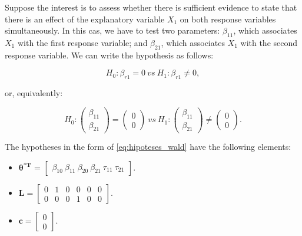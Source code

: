 \documentclass[article]{jss}\usepackage[]{graphicx}\usepackage[]{xcolor}
\begin{document}
Suppose the interest is to assess whether there is sufficient evidence to state that there is an effect of the explanatory variable $X_1$ on both response variables simultaneously. 
In this cas, we  have to test two parameters: $\beta_{11}$, which associates $X_1$ with the first response variable; and $\beta_{21}$, which associates $X_1$ with the second response variable. 
We can write the hypothesis as follows:

\begin{equation}
\label{eq:ex2}
H_0: \beta_{r1} = 0 \ vs \ H_1: \beta_{r1} \neq 0,
\end{equation}

\noindent or, equivalently:

$$
H_0: 
\begin{pmatrix}
\beta_{11} \\ 
\beta_{21}
\end{pmatrix} 
= 
\begin{pmatrix}
0 \\ 
0
\end{pmatrix}
\ vs \ 
H_1: 
\begin{pmatrix}
\beta_{11} \\ 
\beta_{21}
\end{pmatrix} 
\neq
\begin{pmatrix}
0 \\ 
0 
\end{pmatrix}.
$$

The hypotheses in the form of \autoref{eq:hipoteses_wald} have the following elements:

\begin{itemize}
  
  \item $\boldsymbol{\theta^{*T}}$ = $\begin{bmatrix} \beta_{10} \  \beta_{11} \ \beta_{20} \ \beta_{21} \ \tau_{11} \ \tau_{21} \end{bmatrix}$.


\item $\boldsymbol{L} = \begin{bmatrix} 0 & 1 & 0 & 0 & 0 & 0 \\
0 & 0 & 0 & 1 & 0 & 0 \end{bmatrix}.$
 
\item $\boldsymbol{c} = \begin{bmatrix} 0 \\ 0 \end{bmatrix}.$ 

\end{itemize}
\end{document}
